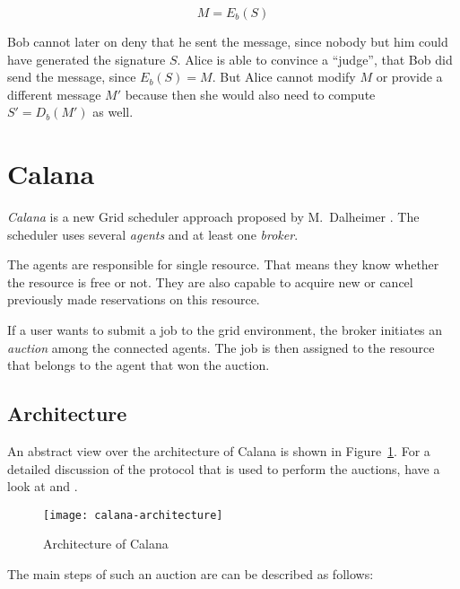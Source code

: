 \begin{equation*}
  \label{eq:validate-signature}
  M = E_b(S)
\end{equation*}

Bob cannot  later on deny that he  sent the message, since  nobody but him
could  have generated  the signature  $S$.  Alice  is able  to  convince a
``judge'', that  Bob did send the  message, since $E_b(S) =  M$. But Alice
cannot modify  $M$ or  provide a different  message $M'$ because  then she
would also need to compute $S' = D_b(M')$ as well.

\section{Calana}
\label{app:sec:calana}

\emph{Calana} is  a new Grid  scheduler approach proposed  by M.~Dalheimer
\cite{dalheimer05agentbased}.   The scheduler  uses  several \emph{agents}
and at  least one  \emph{broker}.

The  agents are  responsible for  single resource.   That means  they know
whether the resource is free or  not. They are also capable to acquire new
or cancel previously made reservations on this resource.

If  a user  wants to  submit a  job to  the grid  environment,  the broker
initiates an  \emph{auction} among the  connected agents. The job  is then
assigned to the resource that belongs to the agent that won the auction.

\subsection{Architecture}

An  abstract   view  over   the  architecture  of   Calana  is   shown  in
Figure~\ref{fig:calana-architecture}.   For a  detailed discussion  of the
protocol  that  is   used  to  perform  the  auctions,   have  a  look  at
\cite{dalheimer06calanaprotocol} and \cite{petry06}.

\begin{figure}[ht]
  \centering
  \texttt{[image: calana-architecture]}
  \caption{Architecture of Calana}
  \label{fig:calana-architecture}
\end{figure}

The main steps of such an auction are can be described as follows:

